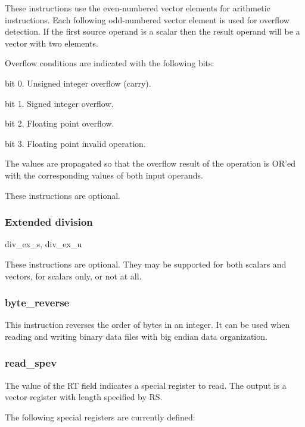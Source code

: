 \documentclass[forwardcom.tex]{subfiles}
\begin{document}
These instructions use the even-numbered vector elements for arithmetic instructions. Each following odd-numbered vector element is used for overflow detection. If the first source operand is a scalar then the result operand will be a vector with two elements.
\vspace{2mm}

Overflow conditions are indicated with the following bits:
\vspace{2mm}

bit 0. Unsigned integer overflow (carry).

bit 1. Signed integer overflow.

bit 2. Floating point overflow.

bit 3. Floating point invalid operation.
\vspace{2mm}

The values are propagated so that the overflow result of the operation is OR'ed with the corresponding values of both input operands.
\vspace{2mm}

These instructions are optional.

\subsubsection{Extended division} \label{extendedDivisionInstruction}
div\_ex\_s, div\_ex\_u
\vspace{2mm}

These instructions are optional. They may be supported for both scalars and vectors, for scalars only, or not at all.

\subsubsection{byte\_reverse}
This instruction reverses the order of bytes in an integer. It can be used when reading and writing binary data files with big endian data organization.

\subsubsection{read\_spev}
The value of the RT field indicates a special register to read. The output is a vector register with length specified by RS.
\vspace{2mm}

The following special registers are currently defined:
\end{document}
